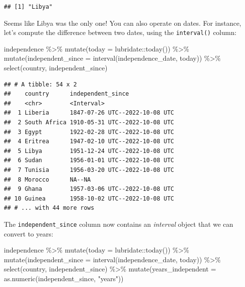 \documentclass[
]{article}
\newenvironment{Shaded}{\begin{snugshade}}{\end{snugshade}}
\newcommand{\AttributeTok}[1]{\textcolor[rgb]{0.77,0.63,0.00}{#1}}
\newcommand{\FunctionTok}[1]{\textcolor[rgb]{0.00,0.00,0.00}{#1}}
\newcommand{\NormalTok}[1]{#1}
\newcommand{\SpecialCharTok}[1]{\textcolor[rgb]{0.00,0.00,0.00}{#1}}
\newcommand{\StringTok}[1]{\textcolor[rgb]{0.31,0.60,0.02}{#1}}
\begin{document}
\begin{verbatim}
## [1] "Libya"
\end{verbatim}

Seems like Libya was the only one! You can also operate on dates. For instance, let's compute the difference between
two dates, using the \texttt{interval()} column:

\begin{Shaded}
\begin{Highlighting}[]
\NormalTok{independence }\SpecialCharTok{\%\textgreater{}\%}
  \FunctionTok{mutate}\NormalTok{(}\AttributeTok{today =}\NormalTok{ lubridate}\SpecialCharTok{::}\FunctionTok{today}\NormalTok{()) }\SpecialCharTok{\%\textgreater{}\%}
  \FunctionTok{mutate}\NormalTok{(}\AttributeTok{independent\_since =} \FunctionTok{interval}\NormalTok{(independence\_date, today)) }\SpecialCharTok{\%\textgreater{}\%}
  \FunctionTok{select}\NormalTok{(country, independent\_since)}
\end{Highlighting}
\end{Shaded}

\begin{verbatim}
## # A tibble: 54 x 2
##    country      independent_since             
##    <chr>        <Interval>                    
##  1 Liberia      1847-07-26 UTC--2022-10-08 UTC
##  2 South Africa 1910-05-31 UTC--2022-10-08 UTC
##  3 Egypt        1922-02-28 UTC--2022-10-08 UTC
##  4 Eritrea      1947-02-10 UTC--2022-10-08 UTC
##  5 Libya        1951-12-24 UTC--2022-10-08 UTC
##  6 Sudan        1956-01-01 UTC--2022-10-08 UTC
##  7 Tunisia      1956-03-20 UTC--2022-10-08 UTC
##  8 Morocco      NA--NA                        
##  9 Ghana        1957-03-06 UTC--2022-10-08 UTC
## 10 Guinea       1958-10-02 UTC--2022-10-08 UTC
## # ... with 44 more rows
\end{verbatim}

The \texttt{independent\_since} column now contains an \emph{interval} object that we can convert to years:

\begin{Shaded}
\begin{Highlighting}[]
\NormalTok{independence }\SpecialCharTok{\%\textgreater{}\%}
  \FunctionTok{mutate}\NormalTok{(}\AttributeTok{today =}\NormalTok{ lubridate}\SpecialCharTok{::}\FunctionTok{today}\NormalTok{()) }\SpecialCharTok{\%\textgreater{}\%}
  \FunctionTok{mutate}\NormalTok{(}\AttributeTok{independent\_since =} \FunctionTok{interval}\NormalTok{(independence\_date, today)) }\SpecialCharTok{\%\textgreater{}\%}
  \FunctionTok{select}\NormalTok{(country, independent\_since) }\SpecialCharTok{\%\textgreater{}\%}
  \FunctionTok{mutate}\NormalTok{(}\AttributeTok{years\_independent =} \FunctionTok{as.numeric}\NormalTok{(independent\_since, }\StringTok{"years"}\NormalTok{))}
\end{Highlighting}
\end{Shaded}
\end{document}
